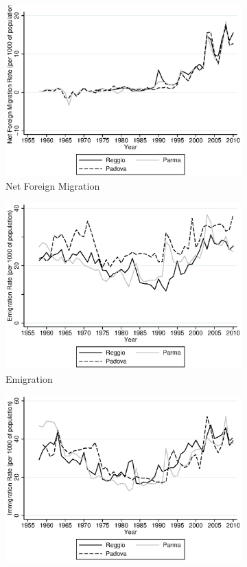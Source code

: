 \begin{figure}[H]
\begin{subfigure}[t]{0.49\textwidth}
          \includegraphics[width=\textwidth]{../../output/image/netforeignmig.eps} 
        \caption{Net Foreign Migration}        
        \end{subfigure}
        \begin{subfigure}[t]{0.49\textwidth}
          \includegraphics[width=\textwidth]{../../output/image/emigration.eps}
            \caption{Emigration}       
        \end{subfigure}
      \begin{subfigure}[ht]{0.48\textwidth}
        \includegraphics[width=\textwidth]{../../output/image/immigration.eps}

\end{subfigure}
\end{figure}
